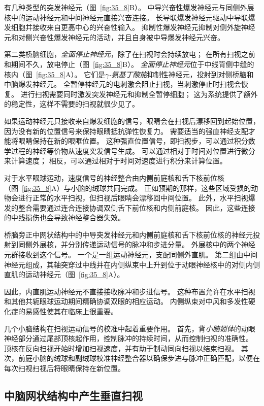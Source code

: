 有几种类型的突发神经元（图~\ref{fig:35_8}B）。
中导兴奋性爆发神经元与同侧外展核中的运动神经元和中间神经元直接兴奋连接。
长导联爆发神经元驱动中导联爆发细胞并接收来自更高中心的兴奋性输入。
抑制性爆发神经元抑制对侧外旋神经元和对侧兴奋性爆发神经元的活动，并且自身被中导爆发神经元兴奋。


第二类桥脑细胞，\textit{全面停止神经元}，除了在扫视时会持续放电；
在所有扫视之前和期间不久，放电停止（图~\ref{fig:35_8}B）。
\textit{全面停止神经元}位于中线背侧中缝的核内（图~\ref{fig:35_8}A）。
它们是\textit{$ \gamma $-氨基丁酸能}抑制性神经元，投射到对侧桥脑和中脑爆发神经元。
全暂停神经元的电刺激会阻止扫视，当刺激停止时扫视会恢复。
进行扫视需要同时激发突发神经元和抑制全暂停细胞；
这为系统提供了额外的稳定性，这样不需要的扫视就很少见了。


如果运动神经元只接收来自爆发细胞的信号，眼睛会在扫视后漂移回到起始位置，因为没有新的位置信号来保持眼睛抵抗弹性恢复力。
需要适当的强直神经支配才能将眼睛保持在新的眼眶位置。
这种强直位置信号，即扫视步，可以通过积分数学过程的神经等价物从速度突发信号生成。
可以通过相对于时间对位置进行微分来计算速度；
相反，可以通过相对于时间对速度进行积分来计算位置。


对于水平眼球运动，速度信号的神经整合由内侧前庭核和舌下核前位核（图~\ref{fig:35_8}A）与小脑的绒球共同完成。
正如预期的那样，这些区域受损的动物会进行正常的水平扫视，但扫视后眼睛会漂移回中间位置。
此外，水平扫视爆发的整合需要通过连合连接协调双侧舌下前位核和内侧前庭核。
因此，这些连接的中线损伤也会导致神经整合器失效。


桥脑旁正中网状结构中的中导突发神经元和内侧前庭核和舌下核前位核的神经元投射到同侧外展核，并分别传递运动信号的脉冲和步进分量。
外展核中的两个神经元群接收到这个信号。
一个是一组运动神经元，支配同侧外直肌。
第二组由中间神经元组成，其轴突穿过中线并在内侧纵束中上升到位于动眼神经核中的对侧内侧直肌的运动神经元（图~\ref{fig:35_8}A）。


因此，内直肌运动神经元不直接接收脉冲和步进信号。
这种布置允许在水平扫视和其他共轭眼球运动期间精确协调双眼的相应运动。
内侧纵束对中风和多发性硬化症的易感性使其在临床上很重要。


几个小脑结构在扫视运动信号的校准中起着重要作用。
首先，背\textit{小脑蚓体}的动眼神经部分通过尾部顶核起作用，控制脉冲的持续时间，从而控制扫视的准确性。
顶核在反向扫视开始时增加扫视速度，并有助于制动同向扫视以结束扫视。
其次，前庭小脑的绒球和副绒球校准神经整合器以确保步进与脉冲正确匹配，以便在每次扫视扫视后将眼睛保持在新位置。



\subsection{中脑网状结构中产生垂直扫视}

